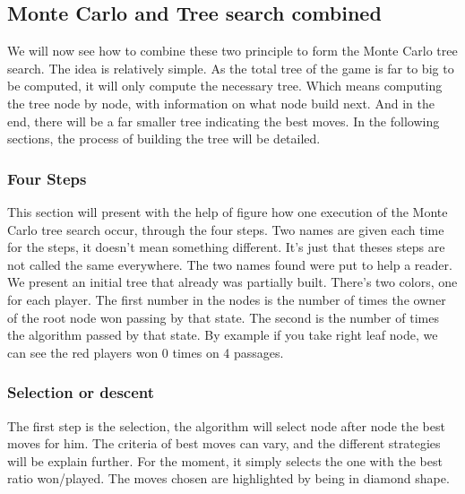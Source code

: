 \subsection{Monte Carlo and Tree search combined}

We will now see how to combine these two principle to form the Monte Carlo tree search. The idea is relatively simple. As the total tree of the game is far to big to be computed, it will only compute the necessary tree. Which means computing the tree node by node, with information on what node build next. And in the end, there will be a far smaller tree indicating the best moves. In the following sections, the process of building the tree will be detailed. 

\subsubsection{Four Steps}
This section will present with the help of figure how one execution of the Monte Carlo tree search occur, through the four steps. Two names are given each time for the steps, it doesn't mean something different. It's just that theses steps are not called the same everywhere. The two names found were put to help a reader. We present an initial tree that already was partially built. There's two colors, one for each player. The first number in the nodes is the number of times the owner of the root node won passing by that state. The second is the number of times the algorithm passed by that state. By example if you take right leaf node, we can see the red players won 0 times on 4 passages. 
\begin{center}
\end{center}

\subsubsection{Selection or descent}
The first step is the selection, the algorithm will select node after node the best moves for him. The criteria of best moves can vary, and the different strategies will be explain further. For the moment, it simply selects the one with the best ratio won/played. The moves chosen are highlighted by being in diamond shape. 

